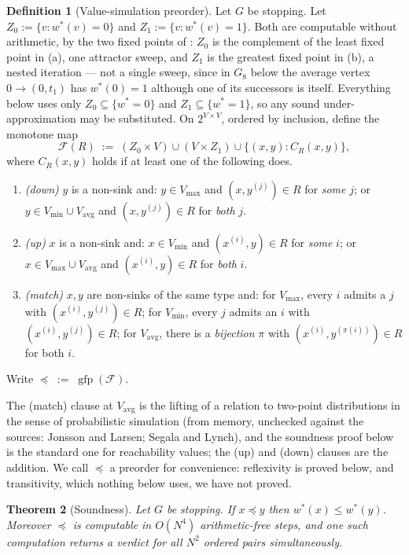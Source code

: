 \documentclass[11pt]{article}
\theoremstyle{plain}
\newtheorem{theorem}{Theorem}[section]
\theoremstyle{definition}
\newtheorem{definition}[theorem]{Definition}
\newcommand{\Vmax}{V_{\max}}
\newcommand{\Vmin}{V_{\min}}
\newcommand{\Vavg}{V_{\mathrm{avg}}}
\begin{document}
\begin{definition}[Value-simulation preorder]\label{def:simorder}
Let $G$ be stopping. Let $Z_0:=\{v:w^\ast(v)=0\}$ and
$Z_1:=\{v:w^\ast(v)=1\}$. Both are computable without arithmetic, by the
two fixed points of : $Z_0$ is the complement of
the least fixed point in (a), one attractor sweep, and $Z_1$ is the
greatest fixed point in (b), a nested iteration --- not a single sweep,
since in $G_8$ below the average vertex $0\to(0,t_1)$ has $w^\ast(0)=1$
although one of its successors is itself. Everything below uses only $Z_0\subseteq\{w^\ast=0\}$ and
$Z_1\subseteq\{w^\ast=1\}$, so any sound under-approximation may be
substituted. On $2^{V\times V}$, ordered by
inclusion, define the monotone map
\[
  \mathcal{F}(R)\;:=\;(Z_0\times V)\cup(V\times Z_1)\cup\{(x,y):C_R(x,y)\},
\]
where $C_R(x,y)$ holds if at least one of the following does.
\begin{enumerate}[label=(\roman*),leftmargin=2.4em]
\item \emph{(down)} $y$ is a non-sink and: $y\in\Vmax$ and $(x,y^{(j)})\in R$
  for \emph{some} $j$; or $y\in\Vmin\cup\Vavg$ and $(x,y^{(j)})\in R$ for
  \emph{both} $j$.
\item \emph{(up)} $x$ is a non-sink and: $x\in\Vmin$ and $(x^{(i)},y)\in R$
  for \emph{some} $i$; or $x\in\Vmax\cup\Vavg$ and $(x^{(i)},y)\in R$ for
  \emph{both} $i$.
\item \emph{(match)} $x,y$ are non-sinks of the same type and: for
  $\Vmax$, every $i$ admits a $j$ with $(x^{(i)},y^{(j)})\in R$; for
  $\Vmin$, every $j$ admits an $i$ with $(x^{(i)},y^{(j)})\in R$; for
  $\Vavg$, there is a \emph{bijection} $\pi$ with
  $(x^{(i)},y^{(\pi(i))})\in R$ for both $i$.
\end{enumerate}
Write $\preceq\;:=\;\operatorname{gfp}(\mathcal{F})$.
\end{definition}

The (match) clause at $\Vavg$ is the lifting of a relation to two-point
distributions in the sense of probabilistic simulation (from memory,
unchecked against the sources: Jonsson and Larsen; Segala and Lynch), and
the soundness proof below is the standard one for reachability values;
the (up) and (down) clauses are the addition. We call $\preceq$ a
preorder for convenience: reflexivity is proved below, and transitivity,
which nothing below uses, we have not proved.

\begin{theorem}[Soundness]\label{thm:simorder-sound}
Let $G$ be stopping. If $x\preceq y$ then $w^\ast(x)\le w^\ast(y)$.
Moreover $\preceq$ is computable in $O(N^{4})$ arithmetic-free steps, and
one such computation returns a verdict for all $N^{2}$ ordered pairs
simultaneously.
\end{theorem}
\end{document}
